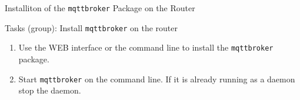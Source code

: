 ﻿\begin{frame}{Installiton of the \alert{\texttt{mqttbroker}} Package on the Router}
{\href{https://github.com/SNodeC/mqttbroker}{}}
\begin{exampleblock}{Tasks (group): Install \texttt{mqttbroker} on the router}
\begin{enumerate}
  \item Use the \alert{WEB interface} or the \alert{command line} to install the \alert{\texttt{mqttbroker}} package.
  \item Start \texttt{mqttbroker} on the command line. If it is already running as a daemon stop the daemon.
\end{enumerate}
\end{exampleblock}
\end{frame}
